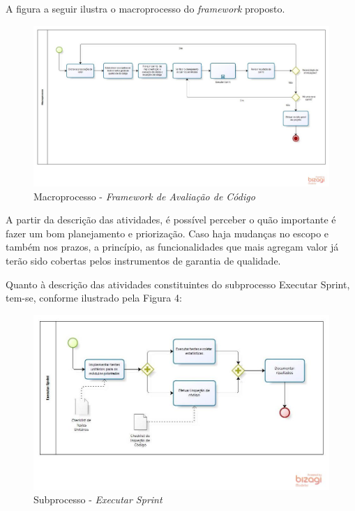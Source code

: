 A figura a seguir ilustra o macroprocesso do \textit{framework} proposto.

\begin{figure}[h]
\includegraphics[width=\textwidth]{figuras/macroprocesso.jpg}
\caption{Macroprocesso - \textit{Framework de Avaliação de Código}}
\end{figure}

A partir da descrição das atividades, é possível perceber o quão importante é fazer um bom planejamento e priorização. Caso haja mudanças no escopo e também nos prazos, a princípio, as funcionalidades que mais agregam valor já terão sido cobertas pelos instrumentos de garantia de qualidade.

Quanto à descrição das atividades constituintes do subprocesso Executar Sprint, tem-se, conforme ilustrado pela Figura 4:

\begin{figure}[h]
\includegraphics[width=\textwidth]{figuras/executarsprint.jpg}
\caption{Subprocesso - \textit{Executar Sprint}}
\end{figure}

